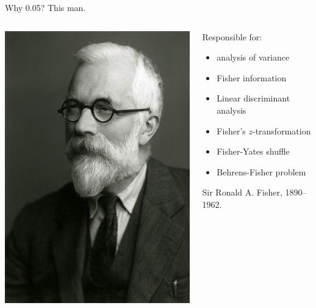 \documentclass[
  ignorenonframetext,
]{beamer}
\begin{document}
\begin{frame}{Why 0.05? This man.}
\protect\hypertarget{why-0.05-this-man.}{}

\begin{columns}
  \begin{column}{0.3\textwidth}
      \includegraphics[width=\textwidth]{fisher}
  \end{column}
  \begin{column}{0.7\textwidth}
    Responsible for:
  
  \begin{itemize}
  \item analysis of variance
  \item Fisher information
  \item Linear discriminant analysis
  \item Fisher's $z$-transformation
  \item Fisher-Yates shuffle
  \item Behrens-Fisher problem
  \end{itemize}
  
   Sir Ronald A. Fisher, 1890--1962.

  \end{column}
\end{columns}

\end{frame}
\end{document}

